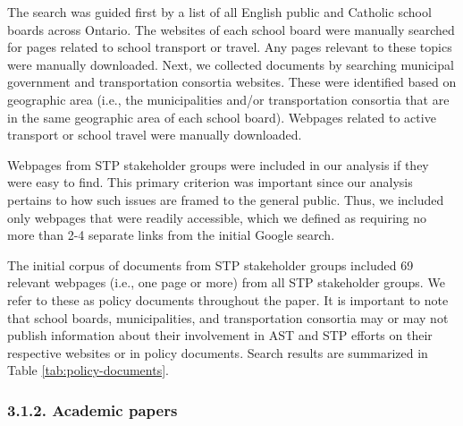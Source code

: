 \documentclass[]{elsarticle} %
\begin{document}
The search was guided first by a list of all English public and Catholic
school boards across Ontario. The websites of each school board were
manually searched for pages related to school transport or travel. Any
pages relevant to these topics were manually downloaded. Next, we
collected documents by searching municipal government and transportation
consortia websites. These were identified based on geographic area
(i.e., the municipalities and/or transportation consortia that are in
the same geographic area of each school board). Webpages related to
active transport or school travel were manually downloaded.

Webpages from STP stakeholder groups were included in our analysis if
they were easy to find. This primary criterion was important since our
analysis pertains to how such issues are framed to the general public.
Thus, we included only webpages that were readily accessible, which we
defined as requiring no more than 2-4 separate links from the initial
Google search.

The initial corpus of documents from STP stakeholder groups included 69
relevant webpages (i.e., one page or more) from all STP stakeholder
groups. We refer to these as policy documents throughout the paper. It
is important to note that school boards, municipalities, and
transportation consortia may or may not publish information about their
involvement in AST and STP efforts on their respective websites or in
policy documents. Search results are summarized in Table
\ref{tab:policy-documents}.

\begin{table}

\caption{\label{tab:policy-documents}\label{tab:search-results}Search results from the main STP stakeholder groups.}
\centering
{}
\end{table}

\hypertarget{academic-papers}{%
\subsubsection{3.1.2. Academic papers}\label{academic-papers}}
\end{document}
